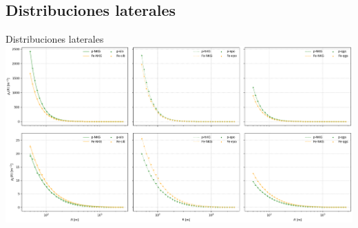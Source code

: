 \documentclass[11pt,table,compress]{beamer}
\begin{document}
	\subsection[Distribuciones]{Distribuciones laterales}
	\begin{frame}{Distribuciones laterales}
	\includegraphics[height=0.8\textheight, width=\textwidth]{Figuras/distlat_pFe}
	\end{frame}
	
\end{document}
